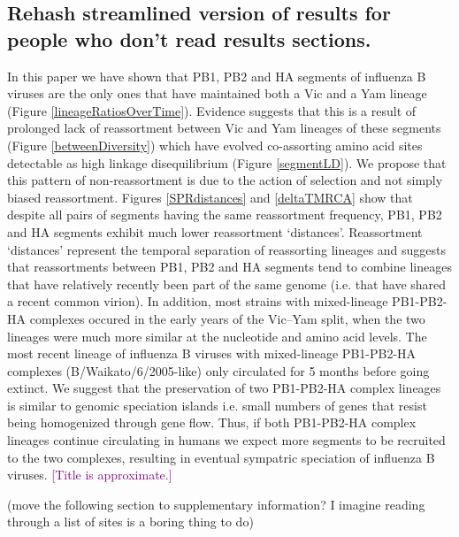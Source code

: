\documentclass[11pt,oneside,letterpaper]{article}
\def\tbc#1{\textcolor{purple}{[#1]}}
\begin{document}
\subsection*{Rehash streamlined version of results for people who don't read results sections.}
In this paper we have shown that PB1, PB2 and HA segments of influenza B viruses are the only ones that have maintained both a Vic and a Yam lineage (Figure \ref{lineageRatiosOverTime}).
Evidence suggests that this is a result of prolonged lack of reassortment between Vic and Yam lineages of these segments (Figure \ref{betweenDiversity}) which have evolved co-assorting amino acid sites detectable as high linkage disequilibrium (Figure \ref{segmentLD}).
We propose that this pattern of non-reassortment is due to the action of selection and not simply biased reassortment.
Figures \ref{SPRdistances} and \ref{deltaTMRCA} show that despite all pairs of segments having the same reassortment frequency, PB1, PB2 and HA segments exhibit much lower reassortment `distances'.
Reassortment `distances' represent the temporal separation of reassorting lineages and suggests that reassortments between PB1, PB2 and HA segments tend to combine lineages that have relatively recently been part of the same genome (i.e. that have shared a recent common virion).
In addition, most strains with mixed-lineage PB1-PB2-HA complexes occured in the early years of the Vic--Yam split, when the two lineages were much more similar at the nucleotide and amino acid levels.
The most recent lineage of influenza B viruses with mixed-lineage PB1-PB2-HA complexes (B/Waikato/6/2005-like) only circulated for 5 months before going extinct.
We suggest that the preservation of two PB1-PB2-HA complex lineages is similar to genomic speciation islands i.e. small numbers of genes that resist being homogenized through gene flow.
Thus, if both PB1-PB2-HA complex lineages continue circulating in humans we expect more segments to be recruited to the two complexes, resulting in eventual sympatric speciation of influenza B viruses. 
\tbc{Title is approximate.}

(move the following section to supplementary information? I imagine reading through a list of sites is a boring thing to do) 
\end{document}
